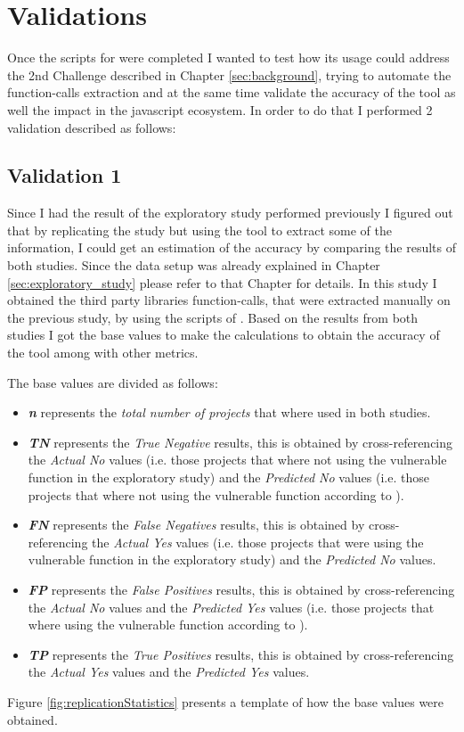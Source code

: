 \chapter{Validations}
\label{sec:validations}

Once the scripts for \tool[] were completed I wanted to test how its usage could address the 2nd Challenge described in Chapter \ref{sec:background}, trying to automate the function-calls extraction and at the same time validate the accuracy of the tool as well the impact in the javascript ecosystem. In order to do that I performed 2 validation described as follows:

\section{Validation 1}

Since I had the result of the exploratory study performed previously I figured out that by replicating the study but using the tool to extract some of the information, I could get an estimation of the accuracy by comparing the results of both studies.
Since the data setup was already explained in Chapter \ref{sec:exploratory_study} please refer to that Chapter for details.
In this study I obtained the third party libraries function-calls, that were extracted manually on the previous study, by using the scripts of \tool[]. Based on the results from both studies I got the base values to make the calculations to obtain the accuracy of the tool among with other metrics. 

The base values are divided as follows:
\begin{itemize}
    \item \textbf{\textit{n}} represents the \textit{total number of projects} that where used in both studies.
    \item \textbf{\textit{TN}} represents the \textit{True Negative} results, this is obtained by cross-referencing the \textit{Actual No} values (i.e. those projects that where not using the vulnerable function in the exploratory study) and the \textit{Predicted No} values (i.e. those projects that where not using the vulnerable function according to \tool[]). 
\enlargethispage{\baselineskip}
    \item \textbf{\textit{FN}} represents the \textit{False Negatives} results, this is obtained by cross-referencing the \textit{Actual Yes} values (i.e. those projects that were using the vulnerable function in the exploratory study) and the \textit{Predicted No} values. 
    \item \textbf{\textit{FP}} represents the \textit{False Positives} results, this is obtained by cross-referencing the \textit{Actual No} values and the \textit{Predicted Yes} values (i.e. those projects that where using the vulnerable function according to \tool[]).
    \item \textbf{\textit{TP}} represents the \textit{True Positives} results, this is obtained by cross-referencing the \textit{Actual Yes} values and the \textit{Predicted Yes} values.
\end{itemize}
Figure \ref{fig:replicationStatistics} presents a template of how the base values were obtained.


